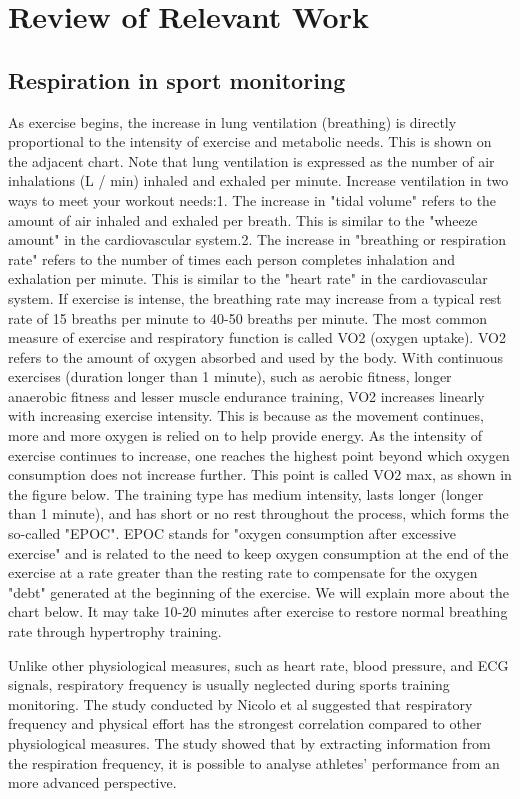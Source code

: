 \chapter{Review of Relevant Work}

\section{Respiration in sport monitoring}
As exercise begins, the increase in lung ventilation (breathing) is directly proportional to the intensity of exercise and metabolic needs. This is shown on the adjacent chart. Note that lung ventilation is expressed as the number of air inhalations (L / min) inhaled and exhaled per minute. Increase ventilation in two ways to meet your workout needs:1. The increase in "tidal volume" refers to the amount of air inhaled and exhaled per breath. This is similar to the "wheeze amount" in the cardiovascular system.2. The increase in "breathing or respiration rate" refers to the number of times each person completes inhalation and exhalation per minute. This is similar to the "heart rate" in the cardiovascular system. If exercise is intense, the breathing rate may increase from a typical rest rate of 15 breaths per minute to 40-50 breaths per minute. The most common measure of exercise and respiratory function is called VO2 (oxygen uptake). VO2 refers to the amount of oxygen absorbed and used by the body. With continuous exercises (duration longer than 1 minute), such as aerobic fitness, longer anaerobic fitness and lesser muscle endurance training, VO2 increases linearly with increasing exercise intensity. This is because as the movement continues, more and more oxygen is relied on to help provide energy. As the intensity of exercise continues to increase, one reaches the highest point beyond which oxygen consumption does not increase further. This point is called VO2 max, as shown in the figure below. The training type has medium intensity, lasts longer (longer than 1 minute), and has short or no rest throughout the process, which forms the so-called "EPOC". EPOC stands for "oxygen consumption after excessive exercise" and is related to the need to keep oxygen consumption at the end of the exercise at a rate greater than the resting rate to compensate for the oxygen "debt" generated at the beginning of the exercise. We will explain more about the chart below. It may take 10-20 minutes after exercise to restore normal breathing rate through hypertrophy training.

Unlike other physiological measures, such as heart rate, blood pressure, and ECG signals, respiratory frequency is usually neglected during sports training monitoring. The study conducted by Nicolo et al suggested that respiratory frequency and physical effort has the strongest correlation compared to other physiological measures.\cite{Nicolo2017RespiratoryMeasure} The study showed that by extracting information from the respiration frequency, it is possible to analyse athletes' performance from an more advanced perspective.


